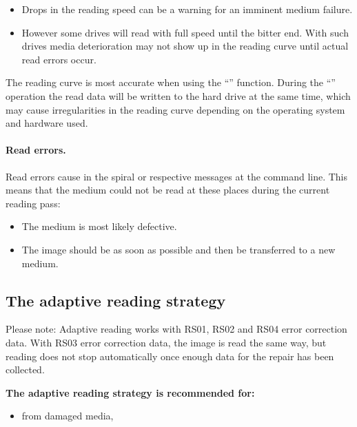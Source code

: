 \begin{itemize}
\item Drops in the reading speed can be a warning for an imminent medium failure.
\item However some drives will read with full speed until the bitter end.
  With such drives media deterioration may not show up in the reading
  curve until actual read errors occur.
\end{itemize}

  The reading curve is most accurate when using
  the ``'' function.
  During the ``'' operation the
  read data will be written to the hard
  drive at the same time, which may cause irregularities in the reading curve
  depending on the operating system and hardware used.

\paragraph{Read errors.} Read errors cause  in
the spiral or respective messages at the command line. This means
that the medium could not be read at these places during the current reading pass:

\begin{itemize}
\item The medium is most likely defective.
\item The image should be  as
  soon as possible and then be transferred to a new medium.
\end{itemize}

\subsection{The adaptive reading strategy}
\label{background-adaptive}

Please note: Adaptive reading works with RS01, RS02 and RS04 error correction data.
With RS03 error correction data, the image is read the same way, but reading does not
stop automatically once enough data for the repair has been collected.

\medskip

{\bf The adaptive reading strategy is recommended for:}

\begin{itemize}
\item {} from damaged media,
\end{itemize}

